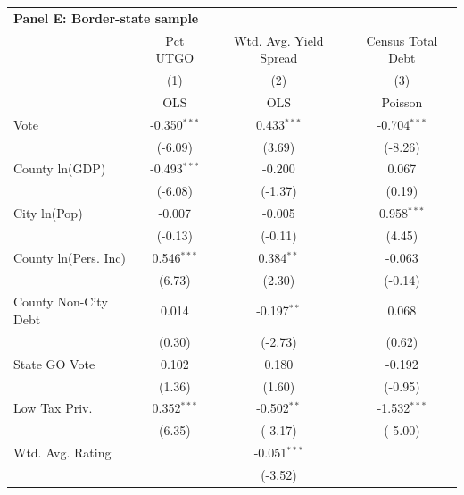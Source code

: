 \begingroup
\centering
\begin{tabular*}{\textwidth}{@{\extracolsep{\fill}}lccc}
\multicolumn{4}{l}{\textbf{Panel E: Border-state sample}}\\

\addlinespace
   \toprule
                               & Pct UTGO       & Wtd. Avg. Yield Spread & Census Total Debt\\  
                               & (1)            & (2)                    & (3)\\  
                               &  OLS           & OLS                    & Poisson\\  
   \midrule 
   Vote                        & -0.350$^{***}$ & 0.433$^{***}$          & -0.704$^{***}$\\   
                               & (-6.09)       & (3.69)                & (-8.26)\\   
   County ln(GDP)              & -0.493$^{***}$ & -0.200                 & 0.067\\   
                               & (-6.08)       & (-1.37)               & (0.19)\\   
   City ln(Pop)                & -0.007         & -0.005                 & 0.958$^{***}$\\   
                               & (-0.13)       & (-0.11)               & (4.45)\\   
   County ln(Pers. Inc)        & 0.546$^{***}$  & 0.384$^{**}$           & -0.063\\   
                               & (6.73)        & (2.30)                & (-0.14)\\   
   County Non-City Debt        & 0.014          & -0.197$^{**}$          & 0.068\\   
                               & (0.30)        & (-2.73)               & (0.62)\\   
   State GO Vote               & 0.102          & 0.180                  & -0.192\\   
                               & (1.36)        & (1.60)                & (-0.95)\\   
   Low Tax Priv.               & 0.352$^{***}$  & -0.502$^{**}$          & -1.532$^{***}$\\   
                               & (6.35)        & (-3.17)               & (-5.00)\\   
   Wtd. Avg. Rating            &                & -0.051$^{***}$         &   \\   
                               &                & (-3.52)               &   \\   

\end{tabular*}
